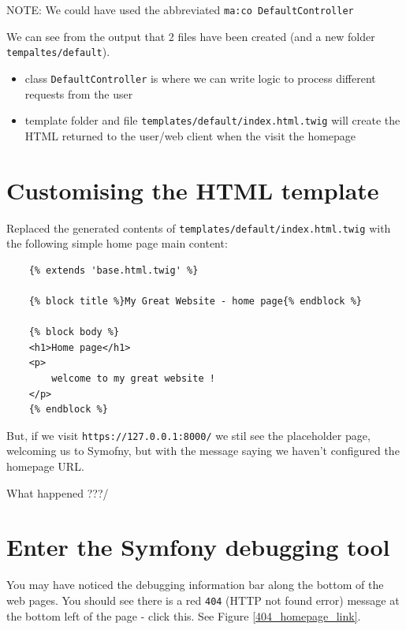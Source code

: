 \documentclass[a4paperpaper,openright]{book}
\providecommand{\tightlist}{%
  \setlength{\itemsep}{0pt}\setlength{\parskip}{0pt}}
\begin{document}
NOTE: We could have used the abbreviated
\texttt{ma:co\ DefaultController}

We can see from the output that 2 files have been created (and a new
folder \texttt{tempaltes/default}).

\begin{itemize}
\tightlist
\item
  class \texttt{DefaultController} is where we can write logic to
  process different requests from the user
\item
  template folder and file \texttt{templates/default/index.html.twig}
  will create the HTML returned to the user/web client when the visit
  the homepage
\end{itemize}

\hypertarget{customising-the-html-template}{%
\section{Customising the HTML
template}\label{customising-the-html-template}}

Replaced the generated contents of
\texttt{templates/default/index.html.twig} with the following simple
home page main content:

\begin{verbatim}
    {% extends 'base.html.twig' %}
    
    {% block title %}My Great Website - home page{% endblock %}
    
    {% block body %}
    <h1>Home page</h1>
    <p>
        welcome to my great website !
    </p>
    {% endblock %}
\end{verbatim}

But, if we visit \texttt{https://127.0.0.1:8000/} we stil see the
placeholder page, welcoming us to Symofny, but with the message saying
we haven't configured the homepage URL.

What happened ???/

\hypertarget{enter-the-symfony-debugging-tool}{%
\section{Enter the Symfony debugging
tool}\label{enter-the-symfony-debugging-tool}}

You may have noticed the debugging information bar along the bottom of
the web pages. You should see there is a red \texttt{404} (HTTP not
found error) message at the bottom left of the page - click this. See
Figure \ref{404_homepage_link}.
\end{document}
